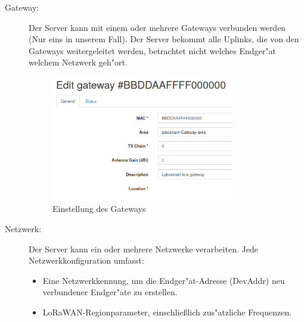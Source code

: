 \begin{description}
	\item[Gateway:] Der Server kann mit einem oder mehrere Gateways
	verbunden werden (Nur eins in unserem Fall). Der Server bekommt alle
	Uplinks, die von den Gateways weitergeleitet werden, betrachtet nicht
	welches Endger"at welchem Netzwerk geh"ort.
	\vspace{10cm}
	\begin{figure}[h]
		\centering
		\includegraphics[width=8cm]{source/images/Gateway}
		\caption{Einstellung des Gateways\label{fig:gateway}}
	\end{figure}

	\item[Netzwerk:] Der Server kann ein oder mehrere Netzwerke
	 verarbeiten. Jede Netzwerkkonfiguration umfasst:
	\begin{itemize}
		\item Eine Netzwerkkennung, um die Endger"at-Adresse (DevAddr) neu
		verbundener Endger"ate zu erstellen.
		\item LoRaWAN-Regionparameter, einschlie\ss{}lich zus"atzliche
		Frequenzen.
	\end{itemize}


\end{description}

